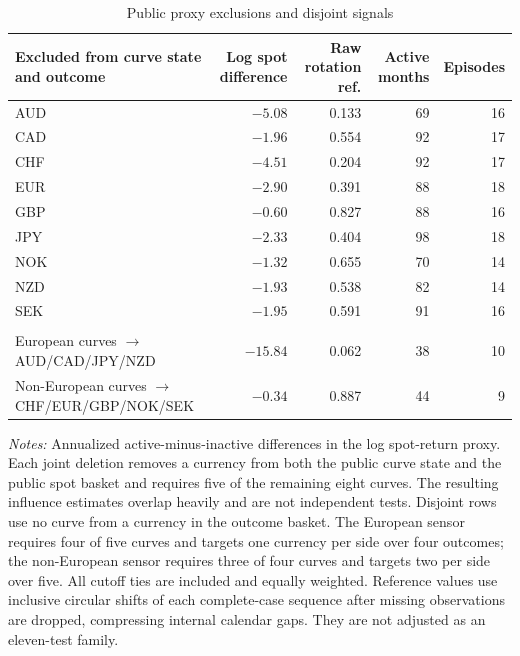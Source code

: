 \begin{table}[H]
\centering
\caption{Public proxy exclusions and disjoint signals}
\label{tab:v03-public-exclusions}
\small
\begin{tabularx}{\textwidth}{>{\raggedright\arraybackslash}Xrrrr}
\toprule
Excluded from curve state and outcome & Log spot difference & Raw rotation ref. & Active months & Episodes \\
\midrule
AUD & $-5.08$ & 0.133 & 69 & 16 \\
CAD & $-1.96$ & 0.554 & 92 & 17 \\
CHF & $-4.51$ & 0.204 & 92 & 17 \\
EUR & $-2.90$ & 0.391 & 88 & 18 \\
GBP & $-0.60$ & 0.827 & 88 & 16 \\
JPY & $-2.33$ & 0.404 & 98 & 18 \\
NOK & $-1.32$ & 0.655 & 70 & 14 \\
NZD & $-1.93$ & 0.538 & 82 & 14 \\
SEK & $-1.95$ & 0.591 & 91 & 16 \\
\midrule
\multicolumn{5}{l}{\emph{Geographically disjoint curve state and outcome}} \\
European curves $\rightarrow$ AUD/CAD/JPY/NZD & $-15.84$ & 0.062 & 38 & 10 \\
Non-European curves $\rightarrow$ CHF/EUR/GBP/NOK/SEK & $-0.34$ & 0.887 & 44 & 9 \\
\bottomrule
\end{tabularx}

\begin{minipage}{0.94\textwidth}
\footnotesize\emph{Notes:} Annualized active-minus-inactive differences in the log spot-return proxy. Each joint deletion removes a currency from both the public curve state and the public spot basket and requires five of the remaining eight curves. The resulting influence estimates overlap heavily and are not independent tests. Disjoint rows use no curve from a currency in the outcome basket. The European sensor requires four of five curves and targets one currency per side over four outcomes; the non-European sensor requires three of four curves and targets two per side over five. All cutoff ties are included and equally weighted. Reference values use inclusive circular shifts of each complete-case sequence after missing observations are dropped, compressing internal calendar gaps. They are not adjusted as an eleven-test family.
\end{minipage}
\end{table}
